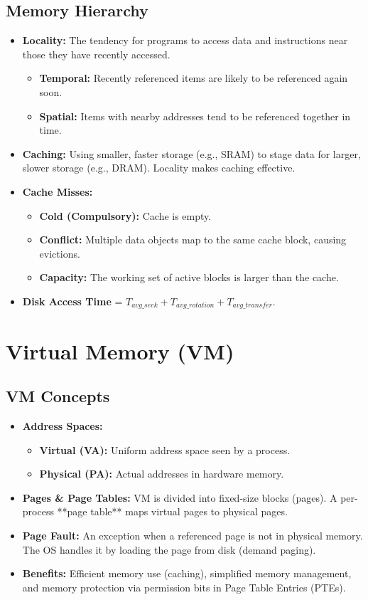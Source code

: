 \documentclass[10pt, twocolumn]{article}
\begin{document}
\subsection*{Memory Hierarchy}
\begin{itemize}
    \item \textbf{Locality:} The tendency for programs to access data and instructions near those they have recently accessed.
    \begin{itemize}
        \item \textbf{Temporal:} Recently referenced items are likely to be referenced again soon.
        \item \textbf{Spatial:} Items with nearby addresses tend to be referenced together in time.
    \end{itemize}
    \item \textbf{Caching:} Using smaller, faster storage (e.g., SRAM) to stage data for larger, slower storage (e.g., DRAM). Locality makes caching effective.
    \item \textbf{Cache Misses:}
    \begin{itemize}
        \item \textbf{Cold (Compulsory):} Cache is empty.
        \item \textbf{Conflict:} Multiple data objects map to the same cache block, causing evictions.
        \item \textbf{Capacity:} The working set of active blocks is larger than the cache.
    \end{itemize}
    \item \textbf{Disk Access Time} = $T_{avg\_seek} + T_{avg\_rotation} + T_{avg\_transfer}$.
\end{itemize}

\section*{Virtual Memory (VM)}
\subsection*{VM Concepts}
\begin{itemize}
    \item \textbf{Address Spaces:}
    \begin{itemize}
        \item \textbf{Virtual (VA):} Uniform address space seen by a process.
        \item \textbf{Physical (PA):} Actual addresses in hardware memory.
    \end{itemize}
    \item \textbf{Pages \& Page Tables:} VM is divided into fixed-size blocks (pages). A per-process **page table** maps virtual pages to physical pages.
    \item \textbf{Page Fault:} An exception when a referenced page is not in physical memory. The OS handles it by loading the page from disk (demand paging).
    \item \textbf{Benefits:} Efficient memory use (caching), simplified memory management, and memory protection via permission bits in Page Table Entries (PTEs).
\end{itemize}
\end{document}
